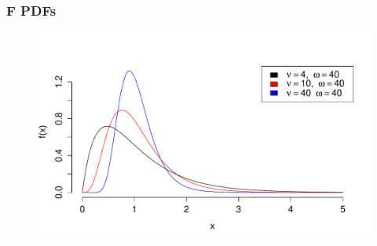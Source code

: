 \documentclass[handout]{beamer}
\begin{document}
\begin{frame}
\frametitle{F PDFs}

\begin{figure}
\includegraphics[scale = 0.58]{./images/Fdist}
\end{figure}
\end{frame}

\end{document}
